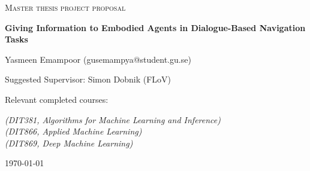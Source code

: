 \documentclass{article}
\begin{document}
\begin{titlepage}
  

\centering
  
  
{\scshape\LARGE Master thesis project proposal\\}
  
\vspace{0.5cm}
  
{\huge\bfseries Giving Information to Embodied Agents in Dialogue-Based Navigation Tasks\\}
  
\vspace{2cm}
  
{\Large Yasmeen Emampoor (gusemampya@student.gu.se)\\}
  
\vspace{1.0cm}
  
{\large Suggested Supervisor: Simon Dobnik (FLoV)\\}
  
\vspace{1.5cm}
  
  
{\large Relevant completed courses:\par}
{\itshape (DIT381, Algorithms for Machine Learning and Inference)\\ (DIT866, Applied Machine Learning) \\ (DIT869, Deep Machine Learning)}
  
\vspace{1.5cm}
  
\vfill

\vfill
  
{\large \today\\} 


\end{titlepage}
\end{document}
